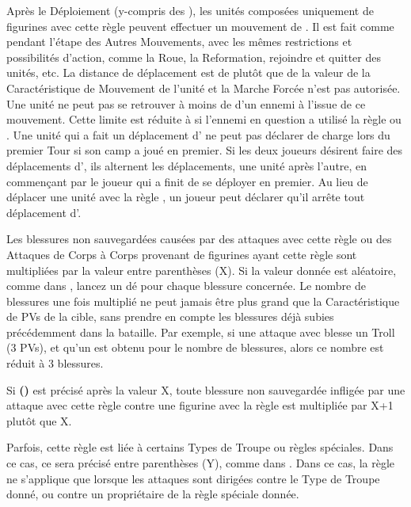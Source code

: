 Après le Déploiement (y-compris des \scouts{}), les unités composées uniquement de figurines avec cette règle peuvent effectuer un mouvement de . Il est fait comme pendant l'étape des Autres Mouvements, avec les mêmes restrictions et possibilités d'action, comme la Roue, la Reformation, rejoindre et quitter des unités, etc. La distance de déplacement est de  plutôt que de la valeur de la Caractéristique de Mouvement de l'unité et la Marche Forcée n'est pas autorisée. Une unité ne peut pas se retrouver à moins de  d'un ennemi à l'issue de ce mouvement. Cette limite est réduite à  si l'ennemi en question a utilisé la règle \vanguard{} ou \scout{}. Une unité qui a fait un déplacement d'\vanguard{} ne peut pas déclarer de charge lors du premier Tour si son camp a joué en premier. Si les deux joueurs désirent faire des déplacements d'\vanguard{}, ils alternent les déplacements, une unité après l'autre, en commençant par le joueur qui a finit de se déployer en premier. Au lieu de déplacer une unité avec la règle \vanguard{}, un joueur peut déclarer qu'il arrête tout déplacement d'\vanguard{}.


Les blessures non sauvegardées causées par des attaques avec cette règle ou des Attaques de Corps à Corps provenant de figurines ayant cette règle sont multipliées par la valeur entre parenthèses (X). Si la valeur donnée est aléatoire, comme dans \og {} \fg{}, lancez un dé pour chaque blessure concernée. Le nombre de blessures une fois multiplié ne peut jamais être plus grand que la Caractéristique de PVs de la cible, sans prendre en compte les blessures déjà subies précédemment dans la bataille. Par exemple, si une attaque avec  blesse un Troll (3 PVs), et qu'un  est obtenu pour le nombre de blessures, alors ce nombre est réduit à 3 blessures.

Si \textbf{(\clippedwings{})} est précisé après la valeur X, toute blessure non sauvegardée infligée par une attaque avec cette règle contre une figurine avec la règle \fly{} est multipliée par X+1 plutôt que X.

Parfois, cette règle est liée à certains Types de Troupe ou règles spéciales. Dans ce cas, ce sera précisé entre parenthèses (Y), comme dans \og {} \fg{}. Dans ce cas, la règle \multiplewounds{}{} ne s'applique que lorsque les attaques sont dirigées contre le Type de Troupe donné, ou contre un propriétaire de la règle spéciale donnée.

